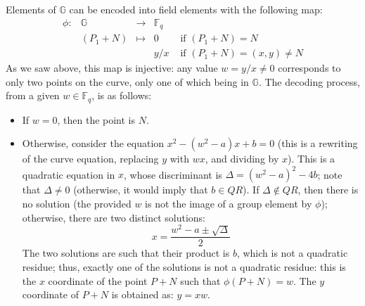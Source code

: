 \documentclass{llncs}
\newcommand{\QR}{QR}
\newcommand{\bF}{\mathbb{F}}
\newcommand{\bG}{\mathbb{G}}
\begin{document}
\vspace{2ex}
Elements of $\bG$ can be encoded into field elements with the following
map:
\begin{equation*}
    \begin{array}{rrcll}
        \phi : & \bG &\longrightarrow & \bF_q & \\
        & (P_1 + N) &\longmapsto & 0 & \text{\ \ \ if\ } (P_1 + N) = N \\
        & & & y/x & \text{\ \ \ if\ } (P_1 + N) = (x, y) \neq N
    \end{array}
\end{equation*}
As we saw above, this map is injective: any value $w = y/x \neq 0$
corresponds to only two points on the curve, only one of which being in
$\bG$. The decoding process, from a given $w \in \bF_q$, is as follows:
\begin{itemize}

    \item If $w = 0$, then the point is $N$.

    \item Otherwise, consider the equation $x^2 - (w^2 - a)x + b = 0$
    (this is a rewriting of the curve equation, replacing $y$ with $wx$,
    and dividing by $x$). This is a quadratic equation in $x$, whose
    discriminant is $\Delta = (w^2 - a)^2 - 4b$; note that $\Delta \neq
    0$ (otherwise, it would imply that $b \in \QR$). If $\Delta \notin
    \QR$, then there is no solution (the provided $w$ is not the image
    of a group element by $\phi$); otherwise, there are two distinct
    solutions:
    \begin{equation*}
        x = \frac{w^2 - a \pm \sqrt{\Delta}}{2}
    \end{equation*}
    The two solutions are such that their product is $b$, which is not a
    quadratic residue; thus, exactly one of the solutions is not a
    quadratic residue: this is the $x$ coordinate of the point $P+N$
    such that $\phi(P+N) = w$. The $y$ coordinate of $P+N$ is obtained
    as: $y = xw$.

\end{itemize}
\end{document}
